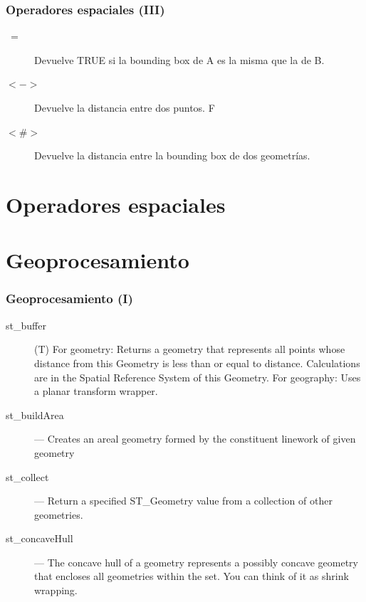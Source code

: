\documentclass{classes/beamer_GeomaticaUA}
\begin{document}
\begin{frame}[fragile]
\frametitle{Operadores espaciales (III)}
\begin{description}
\item[$~=$]Devuelve TRUE si la bounding box de A es la misma que la de B.
\item[$<->$]Devuelve la distancia entre dos puntos. F
\item[$<\#>$]Devuelve la distancia entre la bounding box de dos geometrías. 
\end{description}
\end{frame}

\section[Ejercicios]{Operadores espaciales}


\section[Geoprocesamiento]{Geoprocesamiento}
\begin{frame}[fragile]
\frametitle{Geoprocesamiento (I)}
\begin{description}
\item[st\_buffer] (T) For geometry: Returns a geometry that represents all points whose distance from this Geometry is less than or equal to distance. Calculations are in the Spatial Reference System of this Geometry. For geography: Uses a planar transform wrapper.
\item[st\_buildArea] — Creates an areal geometry formed by the constituent linework of given geometry
\item[st\_collect] — Return a specified ST\_Geometry value from a collection of other geometries.
\item[st\_concaveHull] — The concave hull of a geometry represents a possibly concave geometry that encloses all geometries within the set. You can think of it as shrink wrapping.
\end{description}
\end{frame}
\end{document}
